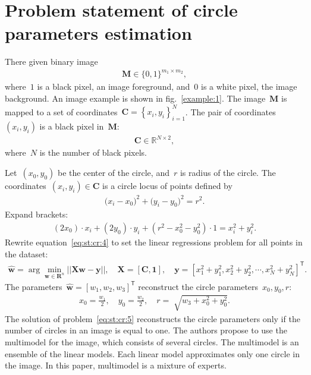 \documentclass[12pt, twoside]{article}
\numberwithin{equation}{section}
\begin{document}
\section{Problem statement of circle parameters estimation}
There given binary image
\[
\label{eq:st:cr:1}
\begin{aligned}
\textbf{M} \in \{0,1\}^{m_1 \times m_2},
\end{aligned}
\]
where~$1$ is a black pixel, an image foreground, and~$0$ is a white pixel, the image background. 
An image example is shown in fig.~\ref{example:1}.
The image~$\textbf{M}$ is mapped to a set of coordinates~\mbox{$\textbf{C}=\left\{x_i, y_i\right\}_{i=1}^{N}$}. The pair of coordinates~$(x_i, y_i)$ is a black pixel in~$\textbf{M}$:
\[
\label{eq:st:cr:2}
\begin{aligned}
\textbf{C} \in  \mathbb{R}^{N \times 2},
\end{aligned}
\]
where~$N$ is the number of black pixels.

Let~$(x_0, y_0)$ be the center of the circle, and~$r$ is radius of the circle.
 The coordinates~$\left(x_i, y_i\right)\in\textbf{C}$ is a circle locus of points defined by
\[
\label{eq:st:cr:3}
\begin{aligned}
\bigr(x_i - x_0\bigr)^{2}+\bigr(y_i-y_0\bigr)^2 = r^2.
\end{aligned}
\]
Expand brackets:
\[
\label{eq:st:cr:4}
\begin{aligned}
\left(2x_0\right)\cdot x_i + \left(2y_0\right)\cdot y_i+\left(r^2-x_0^2-y_0^2\right)\cdot1 = x_{i}^2 + y_{i}^2.
\end{aligned}
\]
Rewrite equation~\eqref{eq:st:cr:4} to set the linear regressions problem for all points in the dataset:
\[
\label{eq:st:cr:5}
\begin{aligned}
\hat{\textbf{w}} = \arg\min_{\textbf{w}\in \mathbf{R}^{n}}||\textbf{X}\textbf{w} - \textbf{y}||,  \quad \textbf{X} = \left[\textbf{C}, \textbf{1}\right], \quad \textbf{y} = \left[x_1^2+y_1^2, x_2^2+y_2^2, \cdots, x_N^2+y_N^2\right]^{\mathsf{T}}.
\end{aligned}
\]
The parameters~$\hat{\textbf{w}} = \left[w_1, w_2, w_3\right]^{\mathsf{T}}$ reconstruct the circle parameters~$x_0, y_0, r$:
\[
\label{eq:st:cr:6}
\begin{aligned}
x_0 = \frac{w_1}{2}, \quad y_0 = \frac{w_2}{2}, \quad r = \sqrt[]{w_3+x_{0}^{2}+y_{0}^{2}}.
\end{aligned}
\]
The solution of problem~\eqref{eq:st:cr:5} reconstructs the circle parameters only if the number of circles in an image is equal to one.
The authors propose to use the multimodel for the image, which consists of several circles.
The multimodel is an ensemble of the linear models.
Each linear model approximates only one circle in the image.
In this paper, multimodel is a mixture of experts.
\end{document}
